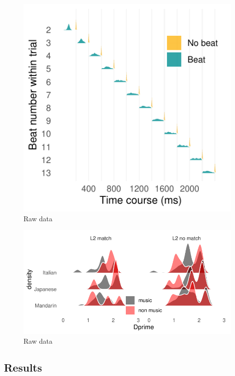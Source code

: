 \documentclass[a4paper]{article}
\begin{document}
\begin{figure}[t]
  \centering
  \includegraphics[width=\linewidth]{SP_24_visuals/Correct_and_Incorrect_distrubutions_by_beat_across_trial.pdf}
  \caption{Raw data}
  \label{fig:beat_data}
\end{figure}

\begin{figure}[t]
  \centering
  \includegraphics[width=\linewidth]{SP_24_visuals/dprime_density_across_tasks.pdf}
  \caption{Raw data}
  \label{fig:beat_data}
\end{figure}

\subsection{Results}
\end{document}
